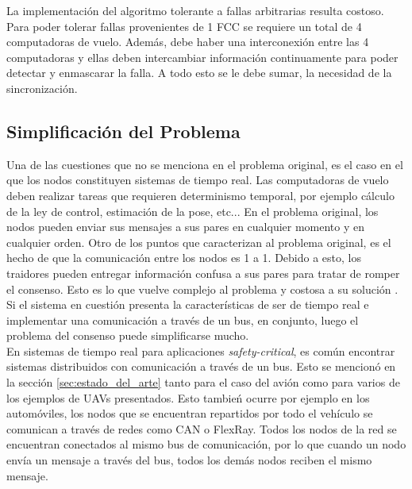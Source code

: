 La implementación del algoritmo tolerante a fallas arbitrarias resulta costoso. Para poder tolerar fallas provenientes de 1 FCC se requiere un total de 4 computadoras de vuelo. Además, debe haber una interconexión entre las 4 computadoras y ellas deben intercambiar información continuamente para poder detectar y enmascarar la falla. A todo esto se le debe sumar, la necesidad de la sincronización.\\

\subsection{Simplificación del Problema}

Una de las cuestiones que no se menciona en el problema original, es el caso en el que los nodos constituyen sistemas de tiempo real. Las computadoras de vuelo deben realizar tareas que requieren determinismo temporal, por ejemplo cálculo de la ley de control, estimación de la pose, etc... En el problema original, los nodos pueden enviar sus mensajes a sus pares en cualquier momento y en cualquier orden. Otro de los puntos que caracterizan al problema original, es el hecho de que la comunicación entre los nodos es 1 a 1. Debido a esto, los traidores pueden entregar información confusa a sus pares para tratar de romper el consenso. Esto es lo que vuelve complejo al problema \cite{lamport2019byzantine} y costosa a su solución \cite{roth2021not}. Si el sistema en cuestión presenta la características de ser de tiempo real e implementar una comunicación a través de un bus, en conjunto, luego el problema del consenso puede simplificarse mucho.\\

En sistemas de tiempo real para aplicaciones \textit{safety-critical}, es común encontrar sistemas distribuidos con comunicación a través de un bus. Esto se mencionó en la sección \ref{sec:estado_del_arte} tanto para el caso del avión como para varios de los ejemplos de UAVs presentados. Esto tambień ocurre por ejemplo en los automóviles, los nodos que se encuentran repartidos por todo el vehículo se comunican a través de redes como CAN\cite{specification1991bosch} o FlexRay\cite{nxpAN12233}. Todos los nodos de la red se encuentran conectados al mismo bus de comunicación, por lo que cuando un nodo envía un mensaje a través del bus, todos los demás nodos reciben el mismo mensaje.

